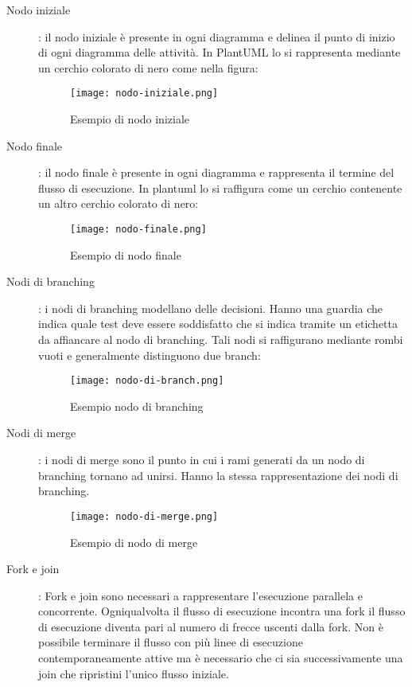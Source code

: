 \documentclass[../../norme-di-progetto.tex]{subfiles}
\begin{document}
\begin{description}
  \item[Nodo iniziale]: il nodo iniziale è presente in ogni diagramma e delinea il punto di inizio di ogni diagramma delle attività. In PlantUML lo si rappresenta mediante un cerchio colorato di nero come nella figura:
        \begin{figure}[H]%
          \label{fig:nodo_iniziale}
          \texttt{[image: nodo-iniziale.png]}
          \centering
          \caption{Esempio di nodo iniziale}
        \end{figure}
  \item[Nodo finale]: il nodo finale è presente in ogni diagramma e rappresenta il termine del flusso di esecuzione.
        In plantuml lo si raffigura come un cerchio contenente un altro cerchio colorato di nero:
        \begin{figure}[H]%
          \label{fig:nodo_finale}
          \texttt{[image: nodo-finale.png]}
          \centering
          \caption{Esempio di nodo finale}
        \end{figure}
  \item[Nodi di branching]: i nodi di branching modellano delle decisioni.
        Hanno una guardia che indica quale test deve essere soddisfatto che si indica tramite un etichetta da affiancare al nodo di branching.
        Tali nodi si raffigurano mediante rombi vuoti e generalmente distinguono due branch:
        \begin{figure}[H]%
          \label{fig:nodo_di_branch}
          \texttt{[image: nodo-di-branch.png]}
          \centering
          \caption{Esempio nodo di branching}
        \end{figure}
  \item[Nodi di merge]: i nodi di merge sono il punto in cui i rami generati da un nodo di branching tornano ad unirsi.
        Hanno la stessa rappresentazione dei nodi di branching.
        \begin{figure}[H]%
          \label{fig:nodo_di_merge}
          \texttt{[image: nodo-di-merge.png]}
          \centering
          \caption{Esempio di nodo di merge}
        \end{figure}
  \item[Fork e join]: Fork e join sono necessari a rappresentare l'esecuzione parallela e concorrente.
        Ogniqualvolta il flusso di esecuzione incontra una fork il flusso di esecuzione diventa pari al numero di frecce uscenti dalla fork.
        Non è possibile terminare il flusso con più linee di esecuzione contemporaneamente attive ma è necessario che ci sia successivamente una join che ripristini l'unico flusso iniziale.

\end{description}
\end{document}
